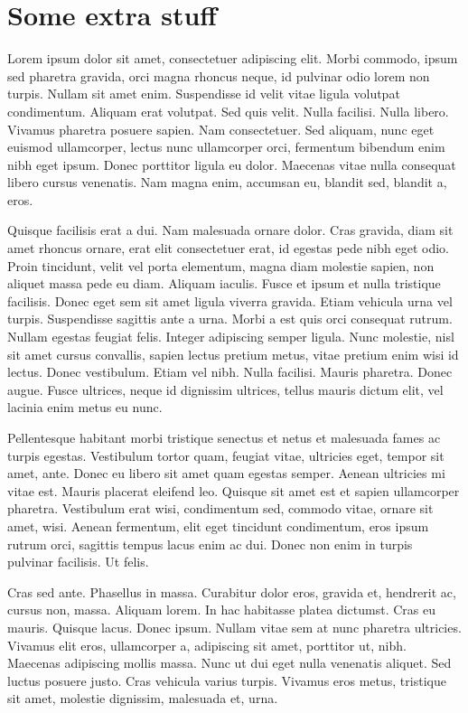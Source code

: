 \chapter{Some extra stuff} \label{AppendixA}

Lorem ipsum dolor sit amet, consectetuer adipiscing elit. Morbi commodo, ipsum
sed pharetra gravida, orci magna rhoncus neque, id pulvinar odio lorem non
turpis. Nullam sit amet enim. Suspendisse id velit vitae ligula volutpat
condimentum. Aliquam erat volutpat. Sed quis velit. Nulla facilisi. Nulla
libero. Vivamus pharetra posuere sapien. Nam consectetuer. Sed aliquam, nunc
eget euismod ullamcorper, lectus nunc ullamcorper orci, fermentum bibendum enim
nibh eget ipsum. Donec porttitor ligula eu dolor. Maecenas vitae nulla
consequat libero cursus venenatis. Nam magna enim, accumsan eu, blandit sed,
blandit a, eros.

Quisque facilisis erat a dui. Nam malesuada ornare dolor. Cras gravida, diam
sit amet rhoncus ornare, erat elit consectetuer erat, id egestas pede nibh eget
odio. Proin tincidunt, velit vel porta elementum, magna diam molestie sapien,
non aliquet massa pede eu diam. Aliquam iaculis. Fusce et ipsum et nulla
tristique facilisis. Donec eget sem sit amet ligula viverra gravida. Etiam
vehicula urna vel turpis. Suspendisse sagittis ante a urna. Morbi a est quis
orci consequat rutrum. Nullam egestas feugiat felis. Integer adipiscing semper
ligula. Nunc molestie, nisl sit amet cursus convallis, sapien lectus pretium
metus, vitae pretium enim wisi id lectus. Donec vestibulum. Etiam vel nibh.
Nulla facilisi. Mauris pharetra. Donec augue. Fusce ultrices, neque id
dignissim ultrices, tellus mauris dictum elit, vel lacinia enim metus eu nunc.

Pellentesque habitant morbi tristique senectus et netus et malesuada fames ac
turpis egestas. Vestibulum tortor quam, feugiat vitae, ultricies eget, tempor
sit amet, ante. Donec eu libero sit amet quam egestas semper. Aenean ultricies
mi vitae est. Mauris placerat eleifend leo. Quisque sit amet est et sapien
ullamcorper pharetra. Vestibulum erat wisi, condimentum sed, commodo vitae,
ornare sit amet, wisi. Aenean fermentum, elit eget tincidunt condimentum, eros
ipsum rutrum orci, sagittis tempus lacus enim ac dui. Donec non enim in turpis
pulvinar facilisis. Ut felis.

Cras sed ante. Phasellus in massa. Curabitur dolor eros, gravida et, hendrerit
ac, cursus non, massa. Aliquam lorem. In hac habitasse platea dictumst. Cras eu
mauris. Quisque lacus. Donec ipsum. Nullam vitae sem at nunc pharetra
ultricies. Vivamus elit eros, ullamcorper a, adipiscing sit amet, porttitor ut,
nibh. Maecenas adipiscing mollis massa. Nunc ut dui eget nulla venenatis
aliquet. Sed luctus posuere justo. Cras vehicula varius turpis. Vivamus eros
metus, tristique sit amet, molestie dignissim, malesuada et, urna.

